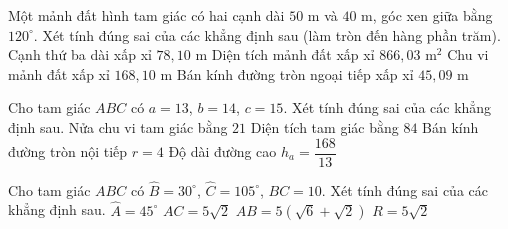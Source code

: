 \begin{ex}%
	Một mảnh đất hình tam giác có hai cạnh dài $50$ m và $40$ m, góc xen giữa bằng $120^\circ$. Xét tính đúng sai của các khẳng định sau (làm tròn đến hàng phần trăm).
	\choiceTF
		{\True Cạnh thứ ba dài xấp xỉ $78{,}10$ m}
		{\True Diện tích mảnh đất xấp xỉ $866{,}03$ m$^2$}
		{Chu vi mảnh đất xấp xỉ $168{,}10$ m}
		{\True Bán kính đường tròn ngoại tiếp xấp xỉ $45{,}09$ m}
\end{ex}

\begin{ex}%
	Cho tam giác $ABC$ có $a=13$, $b=14$, $c=15$. Xét tính đúng sai của các khẳng định sau.
	\choiceTF
		{\True Nửa chu vi tam giác bằng $21$}
		{\True Diện tích tam giác bằng $84$}
		{\True Bán kính đường tròn nội tiếp $r=4$}
		{Độ dài đường cao $h_a=\dfrac{168}{13}$}
\end{ex}

\begin{ex}%
	Cho tam giác $ABC$ có $\widehat{B}=30^\circ$, $\widehat{C}=105^\circ$, $BC=10$. Xét tính đúng sai của các khẳng định sau.
	\choiceTF
		{\True $\widehat{A}=45^\circ$}
		{\True $AC=5\sqrt2$}
		{$AB=5(\sqrt6+\sqrt2)$}
		{\True $R=5\sqrt2$}
\end{ex}

